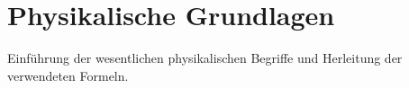\section{Physikalische Grundlagen}
Einführung der wesentlichen physikalischen Begriffe und Herleitung der verwendeten Formeln.